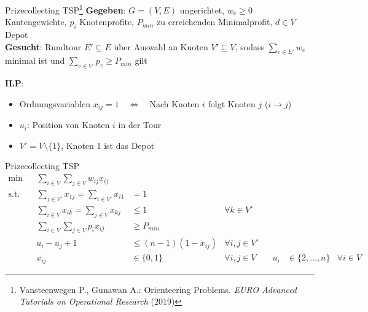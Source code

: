 \documentclass[ngerman,aspectratio=169,10pt]{beamer}
\begin{document}
\begin{frame}{Prizecollecting TSP\footnote{Vansteenwegen P., Gunawan A.: Orienteering Problems. \emph{EURO Advanced Tutorials on Operational Research} (2019)}}
	\textbf{Gegeben}: $G=(V,E)$ ungerichtet, $w_e\geq0$ Kantengewichte, $p_i$ Knotenprofite, $P_{min}$ zu erreichenden Minimalprofit, $d\in V$ Depot\\
	\textbf{Gesucht}: Rundtour $E'\subseteq E$ über Auswahl an Knoten $V'\subseteq V$, sodass $\sum_{e\in E'}w_e$ minimal ist und $\sum_{v\in V'}p_v\geq P_{min}$ gilt
	
	\textbf{ILP}:
	\begin{itemize}
		\item Ordnungsvariablen $x_{ij}=1\quad\Leftrightarrow\quad$Nach Knoten $i$ folgt Knoten $j$ ($i\rightarrow j$)
		\item $u_i$: Position von Knoten $i$ in der Tour
		\item $V'=V\setminus\{1\}$, Knoten 1 ist das Depot
	\end{itemize}
\end{frame}

\begin{frame}{Prizecollecting TSP}
	\begin{align*}
	\min && \sum_{i\in V}\sum_{j\in V}w_{ij}x_{ij}&&\\
	\text{s.t.} && \sum_{j\in V'}x_{1j}=\sum_{i\in V'}x_{i1}&=1&\\
	&& \sum_{i\in V}x_{ik} = \sum_{j\in V}x_{kj}&\leq1 &\forall k\in V'\\
	&& \sum_{i\in V}\sum_{j\in V}p_ix_{ij} &\geq P_{min} &\\
	&& u_i-u_j+1&\leq(n-1)(1-x_{ij})&\forall i,j\in V'\\
	&& x_{ij} &\in\{0,1\} &\forall i,j\in V	
	&& u_i &\in\{2,\ldots,n\} &\forall i\in V
	\end{align*}
\end{frame}
\end{document}
